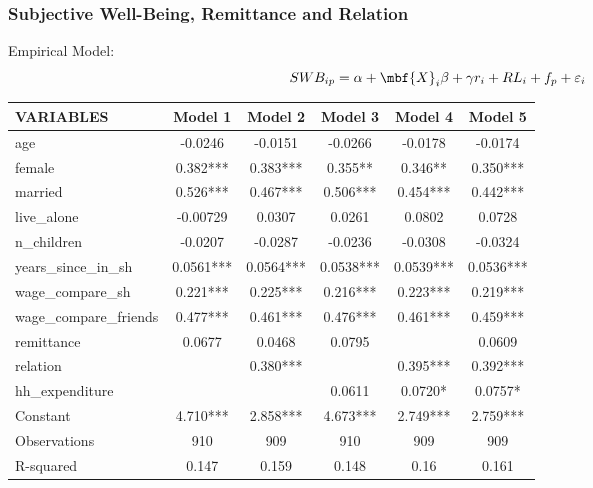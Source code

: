 \documentclass[10pt]{beamer}
\begin{document}
\begin{frame}[c]\frametitle{Subjective Well-Being, Remittance and Relation}
Empirical Model:
\begin{equation}
    SWB_{ip} = \alpha + \mbf{X}_{i}\beta + \gamma r_{i} + RL_{i} + f_{p} + \varepsilon_{i}
\end{equation}
\begin{table}[htbp]
\scriptsize
  \centering
    \begin{tabular}{lccccc}
    \toprule
    VARIABLES & Model 1 & Model 2 & Model 3 & Model 4 & Model 5 \\
    \midrule
    age   & -0.0246 & -0.0151 & -0.0266 & -0.0178 & -0.0174 \\
    female & 0.382*** & 0.383*** & 0.355** & 0.346** & 0.350*** \\
    married & 0.526*** & 0.467*** & 0.506*** & 0.454*** & 0.442*** \\
    live\_alone & -0.00729 & 0.0307 & 0.0261 & 0.0802 & 0.0728 \\
    n\_children & -0.0207 & -0.0287 & -0.0236 & -0.0308 & -0.0324 \\
    years\_since\_in\_sh & 0.0561*** & 0.0564*** & 0.0538*** & 0.0539*** & 0.0536*** \\
    wage\_compare\_sh & 0.221*** & 0.225*** & 0.216*** & 0.223*** & 0.219*** \\
    wage\_compare\_friends & 0.477*** & 0.461*** & 0.476*** & 0.461*** & 0.459*** \\
    remittance & 0.0677 & 0.0468 & 0.0795 &       & 0.0609 \\
    relation &       & 0.380*** &       & 0.395*** & 0.392*** \\
    hh\_expenditure &       &       & 0.0611 & 0.0720* & 0.0757* \\
    Constant & 4.710*** & 2.858*** & 4.673*** & 2.749*** & 2.759*** \\
    Observations & 910   & 909   & 910   & 909   & 909 \\
    R-squared & 0.147 & 0.159 & 0.148 & 0.16  & 0.161 \\
    \bottomrule
    \end{tabular}%
\end{table}%


\end{frame}
\end{document}
